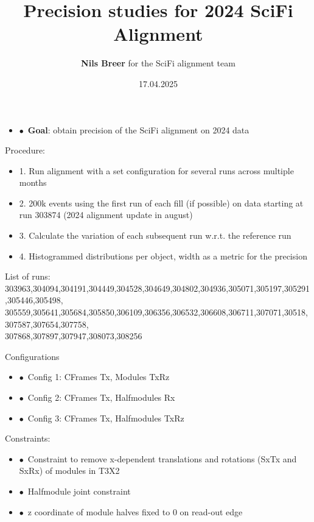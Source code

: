 \documentclass[aspectratio=1610, 12pt, xcolor=dvipsnames]{beamer}
\title{Precision studies for 2024 SciFi Alignment}
\author[N.Breer]{\textbf{Nils Breer} for the SciFi alignment team}
\institute{RTA: WP4/5 Alignment and Calibration}
\date{17.04.2025}
\begin{document}
\maketitle

\begin{frame}
  \begin{itemize}
    \item $\bullet$\, \textbf{Goal}: obtain precision of the SciFi alignment on 2024 data
  \end{itemize}
  Procedure:
  \begin{itemize}
    \item 1. Run alignment with a set configuration for several runs across multiple months
    \item 2. 200k events using the first run of each fill (if possible) on data starting at run 303874 (2024 alignment update in august)
    \item 3. Calculate the variation of each subsequent run w.r.t. the reference run
    \item 4. Histogrammed distributions per object, width as a metric for the precision
  \end{itemize}
  List of runs: 303963,304094,304191,304449,304528,304649,304802,304936,305071,305197,305291,305446,305498, \\
  305559,305641,305684,305850,306109,306356,306532,306608,306711,307071,30518,307587,307654,307758, \\
  307868,307897,307947,308073,308256
\end{frame}

\begin{frame}{Configurations}
  \begin{itemize}
    \item $\bullet$\, Config 1: CFrames Tx, Modules TxRz
    \item $\bullet$\, Config 2: CFrames Tx, Halfmodules Rx
    \item $\bullet$\, Config 3: CFrames Tx, Halfmodules TxRz
  \end{itemize}
  Constraints:
  \begin{itemize}
    \item $\bullet$\, Constraint to remove x-dependent translations and rotations (SxTx and SxRx) of modules in T3X2
    \item $\bullet$\, Halfmodule joint constraint
    \item $\bullet$\, z coordinate of module halves fixed to 0 on read-out edge
  \end{itemize}
\end{frame}
\end{document}
